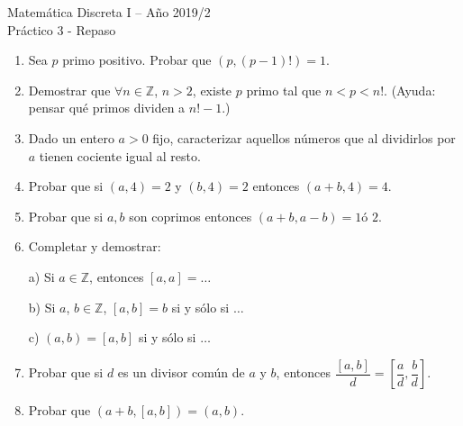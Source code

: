 \documentclass[12pt,spanish,makeidx]{amsbook}
\begin{document}
{\bf \begin{center} Matemática Discreta I -- Año 2019/2 \\Práctico 3 - Repaso\end{center}}


\smallskip

\begin{enumerate}




\item Sea $p$ primo positivo. Probar que $(p,(p-1)!)=1$.

\smallskip

\item Demostrar que $\forall n\in{\mathbb Z}$, $n>2$, existe $p$ primo tal que $n<p<n!$. (Ayuda: pensar qu\'e primos dividen a $n! - 1$.)



\smallskip

\item Dado un entero $a>0$ fijo, caracterizar aquellos n\'umeros que al dividirlos por $a$ tienen cociente igual al resto.

\smallskip


\item Probar que si $(a,4)=2$ y $(b,4)=2$ entonces $(a+b,4)=4$.

\smallskip
\item Probar que si $a,b$ son coprimos entonces $(a+b,a-b)=1 \text{
\'o } 2 $.



\smallskip



\item Completar y demostrar:

a) Si $a \in {\mathbb Z}$, entonces $[a,a]=\dots$

b) Si $a$, $b \in {\mathbb Z}$, $[a,b]=b$ si y s\'olo si $\ldots$

c) $(a,b)=[a,b]$ si y s\'olo si $\ldots$


\smallskip

\item Probar que si $d$ es un divisor com\'un de $a$ y $b$, entonces $\dfrac{[a,b]}{d} = \left[\dfrac{a}{d},\dfrac{b}{d}\right]$.



\smallskip

\item Probar que $(a+b,[a,b])=(a,b)$. %


\end{enumerate}
\end{document}
